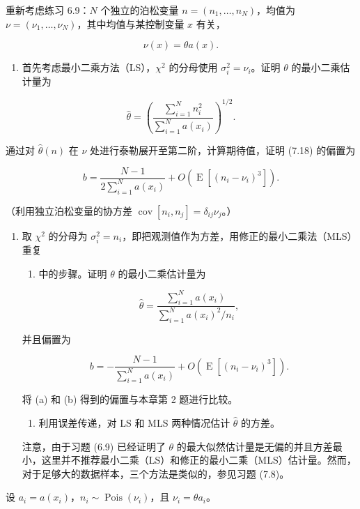 \begin{question}
重新考虑练习 6.9：\(N\) 个独立的泊松变量 \(n=(n_1,\ldots,n_N)\)，均值为
\(\nu=(\nu_1,\ldots,\nu_N)\)，其中均值与某控制变量 \(x\) 有关，

\[
\nu(x)=\theta a(x).
\]

\begin{enumerate}
\item
  首先考虑最小二乘方法（LS），\(\chi^2\) 的分母使用
  \(\sigma_i^2=\nu_i\)。证明 \(\theta\) 的最小二乘估计量为
\end{enumerate}

\[
\hat\theta=\left(\frac{\sum_{i=1}^{N}n_i^2}{\sum_{i=1}^{N}a(x_i)}\right)^{1/2}.
\]

通过对 \(\hat\theta(n)\) 在 \(\nu\)
处进行泰勒展开至第二阶，计算期待值，证明 (7.18) 的偏置为

\[
b=\frac{N-1}{2\sum_{i=1}^{N}a(x_i)}+O(\operatorname{E}[(n_i-\nu_i)^3]).
\]

（利用独立泊松变量的协方差
\(\operatorname{cov}[n_i,n_j]=\delta_{ij}\nu_j\)。）

\begin{enumerate}[start=2]
\item
  取 \(\chi^2\) 的分母为
  \(\sigma_i^2=n_i\)，即把观测值作为方差，用修正的最小二乘法（MLS）重复
\begin{enumerate}
\item 中的步骤。证明 \(\theta\) 的最小二乘估计量为
\end{enumerate}

\[
\hat\theta=\frac{\sum_{i=1}^{N}a(x_i)}{\sum_{i=1}^{N}a(x_i)^2/n_i},
\]

并且偏置为

\[
b=-\frac{N-1}{\sum_{i=1}^{N}a(x_i)}+O(\operatorname{E}[(n_i-\nu_i)^3]).
\]

将 (a) 和 (b) 得到的偏置与本章第 2 题进行比较。

\begin{enumerate}[start=3]
\item
  利用误差传递，对 LS 和 MLS 两种情况估计 \(\hat\theta\) 的方差。
\end{enumerate}

注意，由于习题 (6.9) 已经证明了 \(\theta\)
的最大似然估计量是无偏的并且方差最小，这里并不推荐最小二乘（LS）和修正的最小二乘（MLS）估计量。然而，对于足够大的数据样本，三个方法是类似的，参见习题
(7.8)。
\end{enumerate}
\begin{solution}
设 \(a_i=a(x_i)\)，\(n_i\sim\operatorname{Pois}(\nu_i)\)，且
\(\nu_i=\theta a_i\)。


\end{solution}
\end{question}
